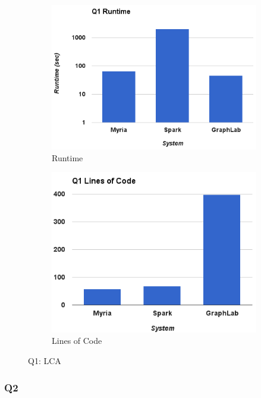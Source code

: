 \begin{figure}[t]
    \centering
    \begin{subfigure}{0.7\linewidth}
        \includegraphics[width=\textwidth]{images/q1_runtime.png}
        \caption{Runtime}
        \label{fig:q1_runtime}
    \end{subfigure}
    \begin{subfigure}{0.7\linewidth}
        \includegraphics[width=\textwidth]{images/q1_loc.png}
        \caption{Lines of Code}
        \label{fig:q1_loc}
    \end{subfigure}
\caption{Q1: LCA}
\label{fig:q1}
\end{figure}

\subsubsection{Q2}

